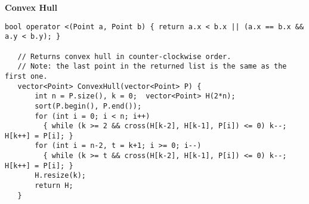 \documentclass[a4paper, 12pt]{article}
\newcommand{\Topic}[1]{\textbf{#1}}
\begin{document}
\Topic{Convex Hull}
\vspace{-5mm}
\begin{Verbatim}[fontsize=\small]
   bool operator <(Point a, Point b) { return a.x < b.x || (a.x == b.x && a.y < b.y); }

   // Returns convex hull in counter-clockwise order.
   // Note: the last point in the returned list is the same as the first one.
   vector<Point> ConvexHull(vector<Point> P) {
       int n = P.size(), k = 0;  vector<Point> H(2*n);
       sort(P.begin(), P.end());
       for (int i = 0; i < n; i++)
         { while (k >= 2 && cross(H[k-2], H[k-1], P[i]) <= 0) k--;  H[k++] = P[i]; }
       for (int i = n-2, t = k+1; i >= 0; i--)
         { while (k >= t && cross(H[k-2], H[k-1], P[i]) <= 0) k--;  H[k++] = P[i]; }
       H.resize(k);
       return H;
   }
\end{Verbatim}
\vspace{-3mm}
\end{document}
